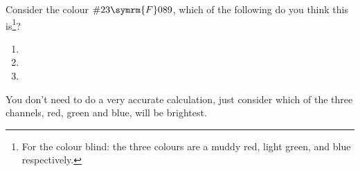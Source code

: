 \documentclass[fleqn]{LectureClass/LectureClass}
\newcommand{\hexadecimaldigit}[1]{\symrm{#1}}
\begin{document}
    \begin{problem}{}{}
        Consider the colour \(\#23\hexadecimaldigit{F}089\), which of the following do you think this is\footnote{For the colour blind: the three colours are a muddy red, light green, and blue respectively.}?
        \tikzexternaldisable
        \begin{enumerate}
            \item 
            \item 
            \item 
        \end{enumerate}
        You don't need to do a very accurate calculation, just consider which of the three channels, red, green and blue, will be brightest.
    \end{problem}
    
\end{document}
